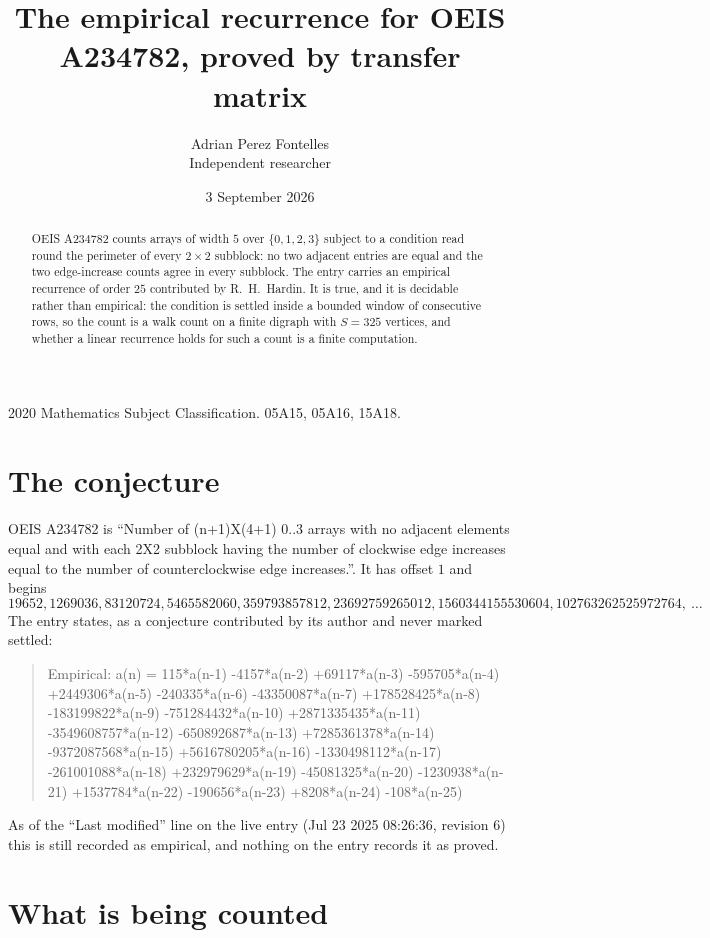 \documentclass[11pt,a4paper]{article}
\title{The empirical recurrence for OEIS A234782, proved by transfer matrix}
\author{Adrian Perez Fontelles\\ \small Independent researcher}
\date{3 September 2026}
\theoremstyle{plain}
\theoremstyle{definition}
\begin{document}
\maketitle

\begin{abstract}
OEIS A234782 counts arrays of width $5$ over $\{0,1,2,3\}$ subject to a condition read round the
perimeter of every $2\times2$ subblock: no two adjacent entries are equal and the two edge-increase counts agree in every subblock. The entry carries an empirical recurrence of
order $25$ contributed by R.~H.~Hardin. It is true, and it is decidable rather than
empirical: the condition is settled inside a bounded window of consecutive rows, so the
count is a walk count on a finite digraph with $S=325$ vertices, and whether a linear
recurrence holds for such a count is a finite computation.
\end{abstract}

\noindent\small 2020 Mathematics Subject Classification. 05A15, 05A16, 15A18.\normalsize

\section{The conjecture}

OEIS A234782 is ``Number of (n+1)X(4+1) 0..3 arrays with no adjacent elements equal and with each 2X2 subblock having the number of clockwise edge increases equal to the number of counterclockwise edge increases.''. It has offset $1$ and begins
\[
19652, 1269036, 83120724, 5465582060, 359793857812, 23692759265012, 1560344155530604, 102763262525972764,\ \dots
\]
The entry states, as a conjecture contributed by its author and never marked settled:
\begin{quote}
Empirical: a(n) = 115*a(n-1) -4157*a(n-2) +69117*a(n-3) -595705*a(n-4) +2449306*a(n-5) -240335*a(n-6) -43350087*a(n-7) +178528425*a(n-8) -183199822*a(n-9) -751284432*a(n-10) +2871335435*a(n-11) -3549608757*a(n-12) -650892687*a(n-13) +7285361378*a(n-14) -9372087568*a(n-15) +5616780205*a(n-16) -1330498112*a(n-17) -261001088*a(n-18) +232979629*a(n-19) -45081325*a(n-20) -1230938*a(n-21) +1537784*a(n-22) -190656*a(n-23) +8208*a(n-24) -108*a(n-25)
\end{quote}
As of the ``Last modified'' line on the live entry (Jul 23 2025 08:26:36, revision 6) this is still
recorded as empirical, and nothing on the entry records it as proved.

\section{What is being counted}
\end{document}
